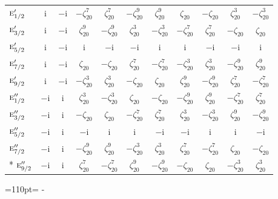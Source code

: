 \documentclass[10pt,a4paper]{article}
\makeatletter
\def\grouprule#1#2{\noalign{\marks\LTgroupmarks{\the\belowrulesep}\nobreak\vskip#1%
  \vskip\aboverulesep}\multispan\LT@cols\unskip{\leaders\hrule\@height#2\hfill\kern\z@}\cr
  \noalign{\penalty\LTrulebreak\vskip\belowrulesep\global\@lastruleclass\z@}}
\newcommand{\needspace}[1]{\par\penalty-100\begingroup\dimen0=#1\relax\dimen2=\pagegoal
  \advance\dimen2-\pagetotal\ifdim\dimen0>\dimen2\relax\ifdim\dimen2>0pt\vfil\break\fi\fi
  \endgroup}
\numberwithin{equation}{section}
\newcommand{\irr}[1]{\text{\normalfont\scshape #1}}
\newcommand{\iunit}{\mathrm{i}}
\newcommand{\rootunity}[1]{\zeta_{#1}}
\makeatother
\begin{document}
{\begin{longtable}{@{}lcccccccccc@{}}
\grouprule{0pt}{\lightrulewidth}
$\irr{e}_{1/2}'$ & $\iunit{}$ & $-\iunit{}$ & $-\rootunity{20}^{7}$ & $\rootunity{20}^{7}$ & $-\rootunity{20}^{9}$ & $\rootunity{20}^{9}$ & $\rootunity{20}$ & $-\rootunity{20}$ & $\rootunity{20}^{3}$ & $-\rootunity{20}^{3}$\\
$\irr{e}_{3/2}'$ & $\iunit{}$ & $-\iunit{}$ & $\rootunity{20}^{9}$ & $-\rootunity{20}^{9}$ & $\rootunity{20}^{3}$ & $-\rootunity{20}^{3}$ & $-\rootunity{20}^{7}$ & $\rootunity{20}^{7}$ & $-\rootunity{20}$ & $\rootunity{20}$\\
$\irr{e}_{5/2}'$ & $\iunit{}$ & $-\iunit{}$ & $\iunit{}$ & $-\iunit{}$ & $-\iunit{}$ & $\iunit{}$ & $\iunit{}$ & $-\iunit{}$ & $-\iunit{}$ & $\iunit{}$\\
$\irr{e}_{7/2}'$ & $\iunit{}$ & $-\iunit{}$ & $\rootunity{20}$ & $-\rootunity{20}$ & $\rootunity{20}^{7}$ & $-\rootunity{20}^{7}$ & $-\rootunity{20}^{3}$ & $\rootunity{20}^{3}$ & $-\rootunity{20}^{9}$ & $\rootunity{20}^{9}$\\
$\irr{e}_{9/2}'$ & $\iunit{}$ & $-\iunit{}$ & $-\rootunity{20}^{3}$ & $\rootunity{20}^{3}$ & $-\rootunity{20}$ & $\rootunity{20}$ & $\rootunity{20}^{9}$ & $-\rootunity{20}^{9}$ & $\rootunity{20}^{7}$ & $-\rootunity{20}^{7}$\\
$\irr{e}_{1/2}''$ & $-\iunit{}$ & $\iunit{}$ & $\rootunity{20}^{3}$ & $-\rootunity{20}^{3}$ & $\rootunity{20}$ & $-\rootunity{20}$ & $-\rootunity{20}^{9}$ & $\rootunity{20}^{9}$ & $-\rootunity{20}^{7}$ & $\rootunity{20}^{7}$\\
$\irr{e}_{3/2}''$ & $-\iunit{}$ & $\iunit{}$ & $-\rootunity{20}$ & $\rootunity{20}$ & $-\rootunity{20}^{7}$ & $\rootunity{20}^{7}$ & $\rootunity{20}^{3}$ & $-\rootunity{20}^{3}$ & $\rootunity{20}^{9}$ & $-\rootunity{20}^{9}$\\
$\irr{e}_{5/2}''$ & $-\iunit{}$ & $\iunit{}$ & $-\iunit{}$ & $\iunit{}$ & $\iunit{}$ & $-\iunit{}$ & $-\iunit{}$ & $\iunit{}$ & $\iunit{}$ & $-\iunit{}$\\
$\irr{e}_{7/2}''$ & $-\iunit{}$ & $\iunit{}$ & $-\rootunity{20}^{9}$ & $\rootunity{20}^{9}$ & $-\rootunity{20}^{3}$ & $\rootunity{20}^{3}$ & $\rootunity{20}^{7}$ & $-\rootunity{20}^{7}$ & $\rootunity{20}$ & $-\rootunity{20}$\\*
$\irr{e}_{9/2}''$ & $-\iunit{}$ & $\iunit{}$ & $\rootunity{20}^{7}$ & $-\rootunity{20}^{7}$ & $\rootunity{20}^{9}$ & $-\rootunity{20}^{9}$ & $-\rootunity{20}$ & $\rootunity{20}$ & $-\rootunity{20}^{3}$ & $\rootunity{20}^{3}$\\
\bottomrule\end{longtable}}
\needspace{110pt}
\end{document}
